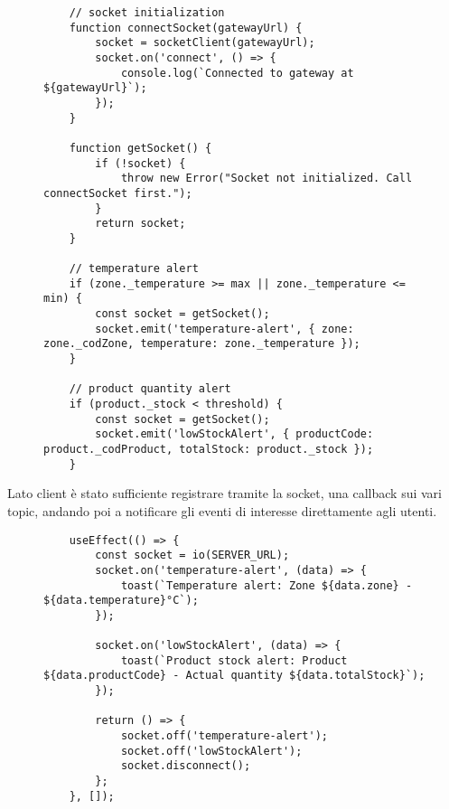 \begin{figure}[H]
\centering
\begin{verbatim}
    // socket initialization
    function connectSocket(gatewayUrl) {
        socket = socketClient(gatewayUrl);
        socket.on('connect', () => {
            console.log(`Connected to gateway at ${gatewayUrl}`);
        });
    }
    
    function getSocket() {
        if (!socket) {
            throw new Error("Socket not initialized. Call connectSocket first.");
        }
        return socket;
    }

    // temperature alert
    if (zone._temperature >= max || zone._temperature <= min) {
        const socket = getSocket();
        socket.emit('temperature-alert', { zone: zone._codZone, temperature: zone._temperature });
    }

    // product quantity alert
    if (product._stock < threshold) {
        const socket = getSocket();
        socket.emit('lowStockAlert', { productCode: product._codProduct, totalStock: product._stock });
    }
\end{verbatim}
\end{figure}

Lato client è stato sufficiente registrare tramite la socket, una callback sui vari topic, andando poi a notificare gli eventi di interesse direttamente agli utenti.

\begin{figure}[H]
\centering
\begin{verbatim}
    useEffect(() => {
        const socket = io(SERVER_URL);
        socket.on('temperature-alert', (data) => {
            toast(`Temperature alert: Zone ${data.zone} - ${data.temperature}°C`);
        });

        socket.on('lowStockAlert', (data) => {
            toast(`Product stock alert: Product ${data.productCode} - Actual quantity ${data.totalStock}`);
        });

        return () => {
            socket.off('temperature-alert');
            socket.off('lowStockAlert');
            socket.disconnect();
        };
    }, []);
\end{verbatim}
\end{figure}